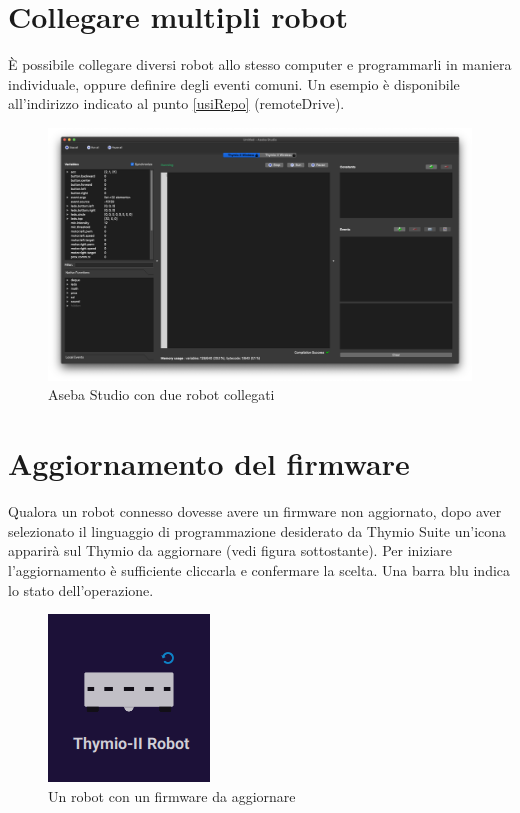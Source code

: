 \documentclass[12pt]{article}
\begin{document}
	
\section{Collegare multipli robot}\label{multi-robot}

	È possibile collegare diversi robot allo stesso computer e programmarli in maniera individuale, oppure definire degli eventi comuni. Un esempio è disponibile all'indirizzo indicato al punto \ref{usiRepo} (remoteDrive).
	
	\begin{figure}[H]
		\includegraphics[width=\textwidth]{img/multiRobot.png}
		\caption{Aseba Studio con due robot collegati}
		\label{multiRobot}
	\end{figure}
	
	\newpage
	
		
\section{Aggiornamento del firmware}
	
	Qualora un robot connesso dovesse avere un firmware non aggiornato, dopo aver selezionato il linguaggio di programmazione desiderato da Thymio Suite un'icona apparirà sul Thymio da aggiornare (vedi figura sottostante). Per iniziare l'aggiornamento è sufficiente cliccarla e confermare la scelta. Una barra blu indica lo stato dell'operazione.
	
	\begin{figure}[H]
		\centering
		\includegraphics{img/fwUpgrade.png}
		\caption{Un robot con un firmware da aggiornare}
		\label{fwUpgrade}
	\end{figure}
	
\end{document}
